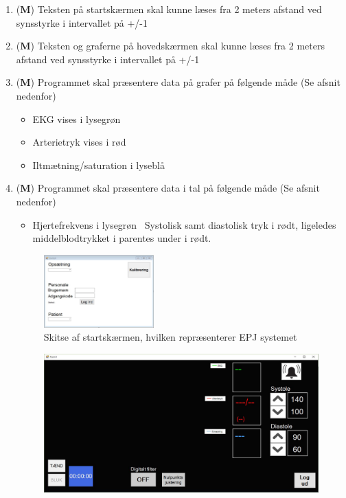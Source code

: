 \begin{enumerate}
\begin{enumerate}
\item (\textbf{M}) Teksten på startskærmen skal kunne læses fra 2 meters afstand ved synsstyrke i intervallet på +/-1
\item (\textbf{M}) Teksten og graferne på hovedskærmen skal kunne læses fra 2 meters afstand ved synsstyrke i intervallet på +/-1 
\item (\textbf{M}) Programmet skal præsentere data på grafer på følgende måde (Se afsnit nedenfor)
\begin{itemize}
\item EKG vises i lysegrøn
\item Arterietryk vises i rød
\item Iltmætning/saturation i lyseblå
\end{itemize}
\item (\textbf{M}) Programmet skal præsentere data i tal på følgende måde (Se afsnit nedenfor)
\begin{itemize}
\item Hjertefrekvens i lysegrøn
\ Systolisk samt diastolisk tryk i rødt, ligeledes middelblodtrykket i parentes under i rødt.
\end{itemize}
\begin{figure}[h!]
\includegraphics[width =0.4\textwidth , center]{billeder/skitseStart}
\caption{Skitse af startskærmen, hvilken repræsenterer EPJ systemet}
\end{figure}
\begin{figure}[h!]
\includegraphics[width =1.0\textwidth , center]{billeder/skitseHoved}

\end{figure}
\end{enumerate}
\end{enumerate}
